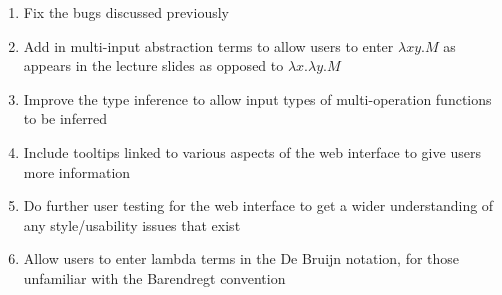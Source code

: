 \documentclass[a4paper,12pt]{report}
\begin{document}
\begin{enumerate}
	\item Fix the bugs discussed previously
	\item Add in multi-input abstraction terms to allow users to enter $\lambda xy.M$ as appears in the lecture slides \cite{Gay2019} as opposed to $\lambda x.\lambda y.M$
	\item Improve the type inference to allow input types of multi-operation functions to be inferred
	\item Include tooltips linked to various aspects of the web interface to give users more information
	\item Do further user testing for the web interface to get a wider understanding of any style/usability issues that exist 
	\item Allow users to enter lambda terms in the De Bruijn notation, for those unfamiliar with the Barendregt convention
\end{enumerate}

\printbibliography
\end{document}
